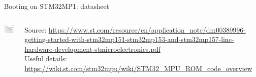 \begin{frame}{Booting on STM32MP1: datasheet}
  \begin{columns}
    \begin{center}
      \includegraphics[height=0.85\textheight]{slides/sysdev-bootloaders-sequence/stm32mp1-rom-code.png}
    \end{center}
    {\tiny
      Source: \url{https://www.st.com/resource/en/application_note/dm00389996-getting-started-with-stm32mp151-stm32mp153-and-stm32mp157-line-hardware-development-stmicroelectronics.pdf}\\
      Useful details: \url{https://wiki.st.com/stm32mpu/wiki/STM32_MPU_ROM_code_overview}
    }
  \end{columns}
\end{frame}

